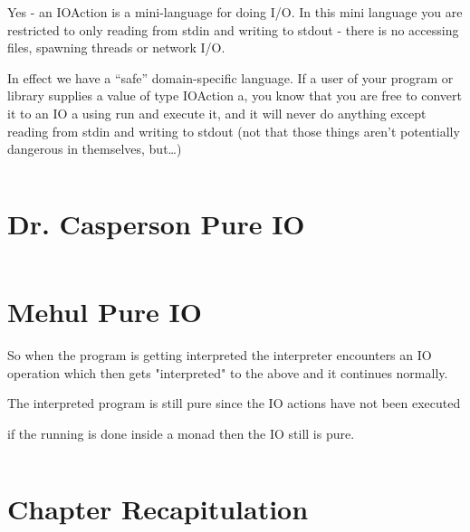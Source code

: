 \documentclass[thesis-solanki.tex]{subfiles}
\begin{document}
Yes - an IOAction is a mini-language for doing I/O. In this mini language you are restricted to only reading from stdin and writing to stdout - there is no accessing files, spawning threads or network I/O.

In effect we have a “safe” domain-specific language. If a user of your program or library supplies a value of type IOAction a, you know that you are free to convert it to an IO a using run and execute it, and it will never do anything except reading from stdin and writing to stdout (not that those things aren’t potentially dangerous in themselves, but…)


\begin{singlespace}
  \inputminted[linenos]{haskell}{haskell-proto4-purvey-wincer.hs}
\end{singlespace}

\section{Dr. Casperson Pure IO}
\begin{singlespace}
  \inputminted[linenos]{haskell}{haskell-proto4-myrtle-uppers.hs}
\end{singlespace}

\section{Mehul Pure IO}

So when the program is getting interpreted the interpreter encounters an IO operation which then gets "interpreted" to the above and it 
continues normally.

The interpreted program is still pure since the IO actions have not been executed 

if the running is done inside a monad then the IO still is pure.


\begin{singlespace}
  \inputminted[linenos]{haskell}{haskell-proto4-platen-winkel.hs}
\end{singlespace}


\section{Chapter Recapitulation}

\ifMain
\begin{scope}
  \nolinenumbers
  \enotesize
  \par
  \begin{singlespace}
  \setlength{\parskip}{12pt plus 2pt minus 1pt}
  \theendnotes
  \par
  \end{singlespace}
\end{scope}
\fi
\end{document}
